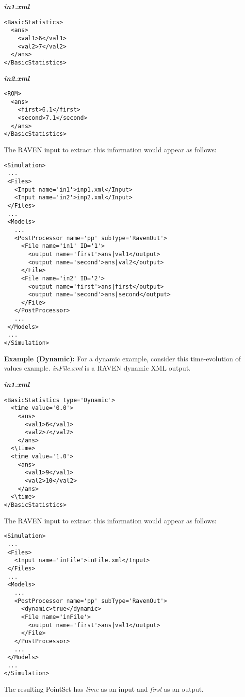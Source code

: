 \textbf{\emph{in1.xml}}
\begin{lstlisting}[style=XML]
<BasicStatistics>
  <ans>
    <val1>6</val1>
    <val2>7</val2>
  </ans>
</BasicStatistics>
\end{lstlisting}
\textbf{\emph{in2.xml}}
\begin{lstlisting}[style=XML]
<ROM>
  <ans>
    <first>6.1</first>
    <second>7.1</second>
  </ans>
</BasicStatistics>
\end{lstlisting}
The RAVEN input to extract this information would appear as follows:
\begin{lstlisting}[style=XML]
<Simulation>
 ...
 <Files>
   <Input name='in1'>inp1.xml</Input>
   <Input name='in2'>inp2.xml</Input>
 </Files>
 ...
 <Models>
   ...
   <PostProcessor name='pp' subType='RavenOut'>
     <File name='in1' ID='1'>
       <output name='first'>ans|val1</output>
       <output name='second'>ans|val2</output>
     </File>
     <File name='in2' ID='2'>
       <output name='first'>ans|first</output>
       <output name='second'>ans|second</output>
     </File>
   </PostProcessor>
   ...
 </Models>
 ...
</Simulation>
\end{lstlisting}

\textbf{Example (Dynamic):}
For a dynamic example, consider this time-evolution of values example.  \emph{inFile.xml} is a RAVEN dynamic
XML output.

\textbf{\emph{in1.xml}}
\begin{lstlisting}[style=XML]
<BasicStatistics type='Dynamic'>
  <time value='0.0'>
    <ans>
      <val1>6</val1>
      <val2>7</val2>
    </ans>
  <\time>
  <time value='1.0'>
    <ans>
      <val1>9</val1>
      <val2>10</val2>
    </ans>
  <\time>
</BasicStatistics>
\end{lstlisting}
The RAVEN input to extract this information would appear as follows:
\begin{lstlisting}[style=XML]
<Simulation>
 ...
 <Files>
   <Input name='inFile'>inFile.xml</Input>
 </Files>
 ...
 <Models>
   ...
   <PostProcessor name='pp' subType='RavenOut'>
     <dynamic>true</dynamic>
     <File name='inFile'>
       <output name='first'>ans|val1</output>
     </File>
   </PostProcessor>
   ...
 </Models>
 ...
</Simulation>
\end{lstlisting}
The resulting PointSet has \emph{time} as an input and \emph{first} as an output.
